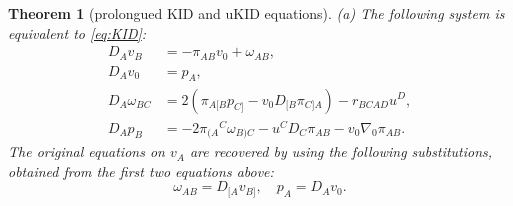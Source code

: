\documentclass[a4paper]{article}
\newtheorem{thm}{Theorem}
\theoremstyle{remark}
\begin{document}
\begin{thm}[prolongued KID and uKID equations] \label{thm:canuKID}
(a) The following system is equivalent to \eqref{eq:KID}:
\begin{equation} \label{eq:canKID}
\begin{aligned}
D_A v_B &= -\pi_{AB} v_0 + \omega_{AB} , \\
D_A v_0 &= p_A , \\
D_A \omega_{BC} &= 2 (\pi_{A[B} p_{C]} - v_0 D_{[B} \pi_{C]A}) - r_{BCAD}
u^D , \\
D_A p_B &= -2\pi_{(A}{}^C \omega_{B)C} - u^C D_C \pi_{AB} - v_0 \nabla_0 \pi_{AB} .
\end{aligned}
\end{equation}
The original equations on $v_A$ are recovered by using the following
substitutions, obtained from the first two equations above:
\begin{equation} \label{eq:canKID-defs}
	\omega_{AB} = D_{[A} v_{B]} , \quad
	p_A = D_A v_0 .
\end{equation}


\end{thm}
\end{document}
